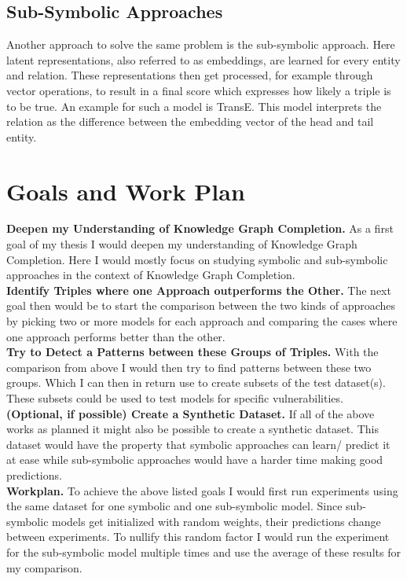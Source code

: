 \documentclass[a4paper]{scrartcl}
\begin{document}
\subsection{Sub-Symbolic Approaches}
Another approach to solve the same problem is the sub-symbolic approach. Here latent representations, also referred to as embeddings, are learned for every entity and relation. These representations then get processed, for example through vector operations, to result in a final score which expresses how likely a triple is to be true. \cite{bordes_learning_2011} 
An example for such a model is TransE. This model interprets the relation as the difference between the embedding vector of the head and tail entity. \cite{bordes_translating_2013}

\section{Goals and Work Plan} 
\hspace*{4mm}\textbf{Deepen my Understanding of Knowledge Graph Completion.} 
As a first goal of my thesis I would deepen my understanding of Knowledge Graph Completion. Here I would mostly focus on studying symbolic and sub-symbolic approaches in the context of Knowledge Graph Completion. \\
\textbf{Identify Triples where one Approach outperforms the Other.} 
The next goal then would be to start the comparison between the two kinds of approaches by picking two or more models for each approach and comparing the cases where one approach performs better than the other. \\
\textbf{Try to Detect a Patterns between these Groups of Triples.}
With the comparison from above I would then try to find patterns between these two groups. Which I can then in return use to create subsets of the test dataset(s). These subsets could be used to test models for specific vulnerabilities. \\
\textbf{(Optional, if possible) Create a Synthetic Dataset.} 
If all of the above works as planned it might also be possible to create a synthetic dataset. This dataset would have the property that symbolic approaches can learn/ predict it at ease while sub-symbolic approaches would have a harder time making good predictions. \\

\textbf{Workplan.}
To achieve the above listed goals I would first run experiments using the same dataset for one symbolic and one sub-symbolic model. Since sub-symbolic models get initialized with random weights, their predictions change between experiments. To nullify this random factor I would run the experiment for the sub-symbolic model multiple times and use the average of these results for my comparison. 
\end{document}
